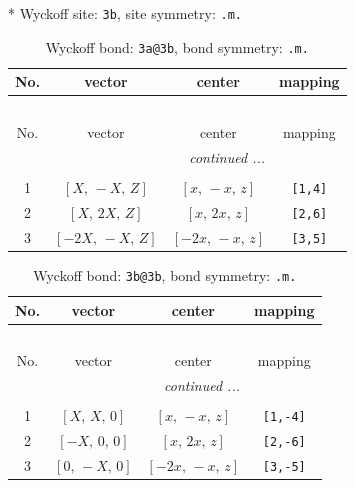 \documentclass[fleqn,8pt]{jsarticle}
\begin{document}
* Wyckoff site: {\tt 3b}, site symmetry: {\tt .m.}
\renewcommand{\arraystretch}{1.2}
\begin{longtable}{cccc}
\caption{Wyckoff bond: {\tt 3a@3b}, bond symmetry: {\tt .m.}}
 \\
 \hline \hline
No. & vector & center & mapping \\ \hline \endfirsthead

\multicolumn{3}{l}{\tablename\ \thetable{}} \\
 \hline \hline
No. & vector & center & mapping \\ \hline \endhead

 \hline \hline
\multicolumn{3}{r}{\footnotesize\it continued ...} \\ \endfoot

 \hline \hline
\multicolumn{3}{r}{} \\ \endlastfoot

1 & $\left[ X,\, - X,\, Z \right]$ & $\left[ x,\, - x,\, z \right]$ & {\tt [1,4]} \\ \hline
2 & $\left[ X,\, 2 X,\, Z \right]$ & $\left[ x,\, 2 x,\, z \right]$ & {\tt [2,6]} \\ \hline
3 & $\left[ - 2 X,\, - X,\, Z \right]$ & $\left[ - 2 x,\, - x,\, z \right]$ & {\tt [3,5]} \\
\end{longtable}
\renewcommand{\arraystretch}{1.2}
\begin{longtable}{cccc}
\caption{Wyckoff bond: {\tt 3b@3b}, bond symmetry: {\tt .m.}}
 \\
 \hline \hline
No. & vector & center & mapping \\ \hline \endfirsthead

\multicolumn{3}{l}{\tablename\ \thetable{}} \\
 \hline \hline
No. & vector & center & mapping \\ \hline \endhead

 \hline \hline
\multicolumn{3}{r}{\footnotesize\it continued ...} \\ \endfoot

 \hline \hline
\multicolumn{3}{r}{} \\ \endlastfoot

1 & $\left[ X,\, X,\, 0 \right]$ & $\left[ x,\, - x,\, z \right]$ & {\tt [1,-4]} \\ \hline
2 & $\left[ - X,\, 0,\, 0 \right]$ & $\left[ x,\, 2 x,\, z \right]$ & {\tt [2,-6]} \\ \hline
3 & $\left[ 0,\, - X,\, 0 \right]$ & $\left[ - 2 x,\, - x,\, z \right]$ & {\tt [3,-5]} \\
\end{longtable}
\end{document}
